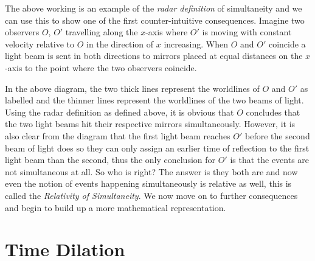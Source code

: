 \documentclass[a4paper,12pt,draft]{report}
\begin{document}
The above working is an example of the \emph{radar definition} of simultaneity and we can use this to show one of the first counter-intuitive consequences. Imagine two observers $O$, $O'$ travelling along the $x$-axis where $O'$ is moving with constant velocity relative to $O$ in the direction of $x$ increasing. When $O$ and $O'$ coincide a light beam is sent in both directions to mirrors placed at equal distances on the $x$-axis to the point where the two observers coincide.
\begin{center}
\end{center}
In the above diagram, the two thick lines represent the worldlines of $O$ and $O'$ as labelled and the thinner lines represent the worldlines of the two beams of light. Using the radar definition as defined above, it is obvious that $O$ concludes that the two light beams hit their respective mirrors simultaneously. However, it is also clear from the diagram that the first light beam reaches $O'$ before the second beam of light does so they can only assign an earlier time of reflection to the first light beam than the second, thus the only conclusion for $O'$ is that the events are not simultaneous at all. So who is right? The answer is they both are and now even the notion of events happening simultaneously is relative as well, this is called the \emph{Relativity of Simultaneity}. We now move on to further consequences and begin to build up a more mathematical representation.

\section{Time Dilation}
\end{document}
